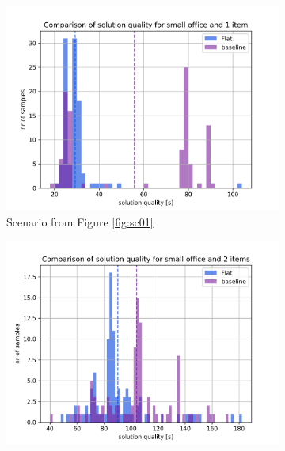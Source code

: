 \begin{figure}
    \centering
    \begin{subfigure}[t]{0.49\textwidth}
        \includegraphics[width=\textwidth]{Report/images/sol_quality/envsmall_sc01_solqual_hist.png}
        \caption{Scenario from Figure \ref{fig:sc01}}
        \label{subfig:b1vsFlat_sc01}
    \end{subfigure}
    \begin{subfigure}[t]{0.49\textwidth}
         \includegraphics[width=\textwidth]{Report/images/sol_quality/envsmall_sc04_solqual_hist.png}

\end{subfigure}
\end{figure}

